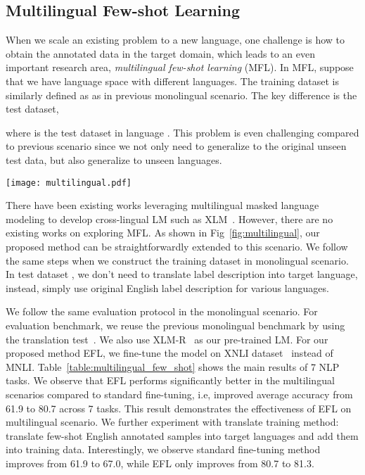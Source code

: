 \documentclass{article}
\begin{document}
\subsection{Multilingual Few-shot Learning}

When we scale an existing problem to a new language, one challenge is how to obtain the annotated data in the target domain, which leads to an even important research area, \textit{multilingual few-shot learning} (MFL). In MFL, suppose that we have language space  with  different languages. The training dataset is similarly defined as  as in previous monolingual scenario. The key difference is the test dataset,

where  is the test dataset in language . This problem is even challenging compared to previous scenario since we not only need to generalize to the original unseen test data, but also generalize to unseen languages.

\begin{figure*}[h]
  \centering
  \texttt{[image: multilingual.pdf]}
  \caption{Generalization of our proposed method to multilingual few-shot learning: we first fine-tune on English data with few annotated examples and then test it on multilingual data.}
  \label{fig:multilingual}
\end{figure*}

There have been existing works leveraging multilingual masked language modeling to develop cross-lingual LM such as XLM~\citep{lample2019cross}. However, there are no existing works on exploring MFL. As shown in Fig~\ref{fig:multilingual}, our proposed method can be straightforwardly extended to this scenario. We follow the same steps when we construct the training dataset in monolingual scenario. In test dataset , we don't need to translate label description into target language, instead, simply use original English label description for various languages.

We follow the same evaluation protocol in the monolingual scenario. For evaluation benchmark, we reuse the previous monolingual benchmark by using the translation test~\citep{ott2018scaling}. We also use XLM-R~\citep{conneau2020unsupervised} as our pre-trained LM. For our proposed method EFL, we fine-tune the model on XNLI dataset~\citep{conneau2018xnli} instead of MNLI. Table~\ref{table:multilingual_few_shot} shows the main results of 7 NLP tasks. We observe that EFL performs significantly better in the multilingual scenarios compared to standard fine-tuning, i.e, improved average accuracy from 61.9 to 80.7 across 7 tasks. This result demonstrates the effectiveness of EFL on multilingual scenario. We further experiment with translate training method: translate few-shot English annotated samples into target languages and add them into training data. Interestingly, we observe standard fine-tuning method improves from 61.9 to 67.0, while EFL only improves from 80.7 to 81.3.
\end{document}
